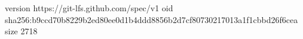version https://git-lfs.github.com/spec/v1
oid sha256:b9ccd70b8229b2ed80ee0d1b4ddd8856b2d7cf80730217013a1f1cbbd26f6cea
size 2718
